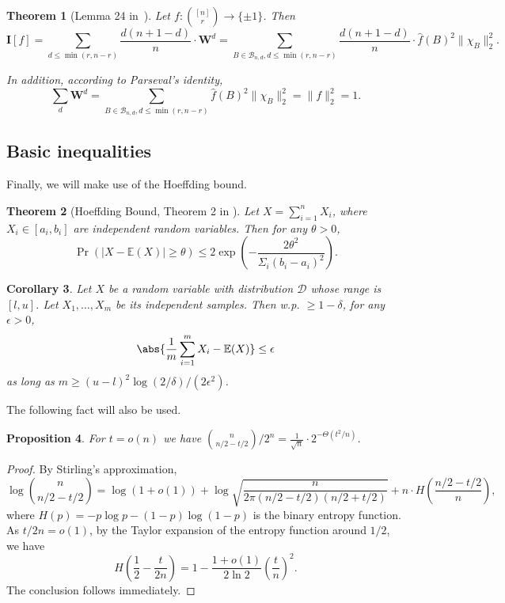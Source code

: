 \documentclass[11pt]{article}
\numberwithin{equation}{section}
\newtheorem{theorem}{Theorem}[section]
\newtheorem{proposition}[theorem]{Proposition}
\newtheorem{corollary}[theorem]{Corollary}
\theoremstyle{definition}
\theoremstyle{plain}
\newcommand{\W}{\mathbf{W}}
\newcommand{\I}{\mathbf{I}}
\newcommand{\warn}[1]{#1}
\begin{document}
%
\begin{theorem}[Lemma 24 in~\cite{Filmus}]\label{slice_inf} %
Let $f:
%
\binom{[n]}{r} %
\rightarrow \{\pm1\}$. Then
%
\begin{equation} %
\I[f]=\sum_{d \leq \min(r,n-r)}\frac{d(n+1-d)}{n} \cdot \W^d
 = \sum_{B\in \mathcal{B}_{n,d}, d \leq \min(r,n-r)}\frac{d(n+1-d)}{n} \cdot \hat{f}(B)^2\| \chi_B\|_2^2.
%
\end{equation} %

In addition, according to Parseval's identity,
%
\begin{equation} %
\sum_d \W^d = \sum_{B\in \mathcal{B}_{n,d},d\leq \min(r,n-r)}\hat{f}(B)^2\| \chi_B\|_2^2=\| f\|_2^2=1.
%
\end{equation} %
\end{theorem}

\subsection{Basic inequalities}
Finally, we will make use of the Hoeffding bound.
%
%
\begin{theorem}[Hoeffding Bound, Theorem 2 in \cite{Hoeffdingbound}] %
	Let $X=\sum_{i=1}^{n}X_i$, where $X_i\in[a_i,b_i]$ are independent random variables. Then for any $\theta>0$,
\begin{equation} %
\Pr(|X-\mathbb{E}(X)|\geq \theta)\leq 2\exp\left(-\frac{2\theta^2}{\Sigma_{i}(b_i-a_i)^2}\right).
%
\end{equation} %
\end{theorem}

\begin{corollary}\label{Coro:Heff}
  Let $X$ be a random variable with distribution $\mathcal{D}$ whose range is $[l,u]$. Let $X_1,\ldots,X_m$ be its independent samples. Then w.p.
%
$\ge 1-\delta$,  %
for any $\epsilon>0$,
\begin{equation} %
\abs{\frac{1}{m}\sum_{i=1}^{m}X_i-\mathbb{E}(X)}\leq \epsilon
%
\end{equation} %
	as long as $m\geq (u-l)^2\log(2/\delta)/(2\epsilon^2)$.
\end{corollary}

\warn{
The following fact will also be used.
\begin{proposition}\label{prop:binomial}
For
%
%
$t=o(n)$ we have  %
%
$\binom{n}{n/2-t/2}/2^n %
=\frac{1}{\sqrt{n}}\cdot 2^{-\Theta(t^2/n)}$.
%
\end{proposition}
\begin{proof}
By Stirling's approximation,
%
\begin{equation} %
\log %
\binom{n}{n/2-t/2} %
=\log(1+o(1))+\log\sqrt{\frac{n}{2\pi(n/2-t/2)(n/2+t/2)}}+n\cdot H\left(\frac{n/2-t/2}{n}\right),
%
\end{equation} %
where $H(p)=-p\log p-(1-p)\log(1-p)$ is the binary entropy function.
As $t/2n=o(1)$, by the Taylor expansion of the entropy function around $1/2$, we have 
%
\begin{equation} %
H\left(\frac{1}{2}-\frac{t}{2n}\right)=1-\frac{1+o(1)}{2\ln 2}\left(\frac{t}{n}\right)^2.
%
\end{equation} %
The conclusion follows immediately.
\end{proof}
}
\end{document}

